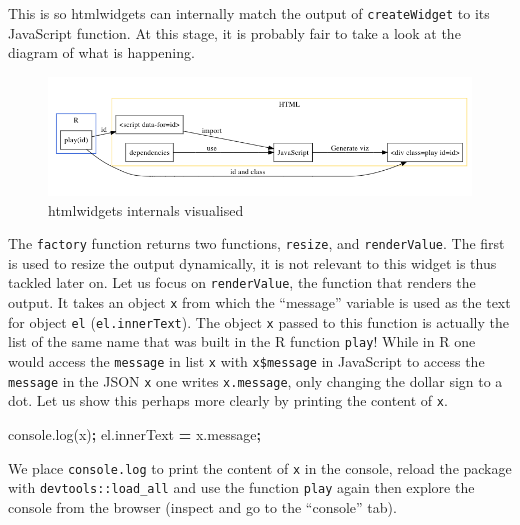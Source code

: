 \documentclass[
  10pt,
]{krantz}
\makeatletter
\newenvironment{Shaded}{\begin{snugshade}}{\end{snugshade}}
\newcommand{\AttributeTok}[1]{\textcolor[rgb]{0.61,0.61,0.61}{#1}}
\newcommand{\NormalTok}[1]{#1}
\newcommand{\OperatorTok}[1]{\textcolor[rgb]{0.43,0.43,0.43}{\textbf{#1}}}
\newcommand{\VariableTok}[1]{\textcolor[rgb]{0,0,0}{#1}}
\newenvironment{kframe}{%
\medskip{}
\setlength{\fboxsep}{.8em}
 \def\at@end@of@kframe{}%
 \ifinner\ifhmode%
  \def\at@end@of@kframe{\end{minipage}}%
  \begin{minipage}{\columnwidth}%
 \fi\fi%
 \def\FrameCommand##1{\hskip\@totalleftmargin \hskip-\fboxsep
 \colorbox{shadecolor}{##1}\hskip-\fboxsep
     \hskip-\linewidth \hskip-\@totalleftmargin \hskip\columnwidth}%
 \MakeFramed {\advance\hsize-\width
   \@totalleftmargin\z@ \linewidth\hsize
   \@setminipage}}%
 {\par\unskip\endMakeFramed%
 \at@end@of@kframe}
\renewenvironment{Shaded}{\begin{kframe}}{\end{kframe}}
\makeatother
\begin{document}
This is so htmlwidgets can internally match the output of \texttt{createWidget} to its JavaScript function. At this stage, it is probably fair to take a look at the diagram of what is happening.

\begin{figure}[H]

{\centering \includegraphics[width=1\linewidth]{images/03-htmlwidgets-internals} 

}

\caption{htmlwidgets internals visualised}\label{fig:widget-internals-diagram}
\end{figure}

The \texttt{factory} function returns two functions, \texttt{resize}, and \texttt{renderValue}. The first is used to resize the output dynamically, it is not relevant to this widget is thus tackled later on. Let us focus on \texttt{renderValue}, the function that renders the output. It takes an object \texttt{x} from which the ``message'' variable is used as the text for object \texttt{el} (\texttt{el.innerText}). The object \texttt{x} passed to this function is actually the list of the same name that was built in the R function \texttt{play}! While in R one would access the \texttt{message} in list \texttt{x} with \texttt{x\$message} in JavaScript to access the \texttt{message} in the JSON \texttt{x} one writes \texttt{x.message}, only changing the dollar sign to a dot. Let us show this perhaps more clearly by printing the content of \texttt{x}.

\begin{Shaded}
\begin{Highlighting}[]
\VariableTok{console}\NormalTok{.}\AttributeTok{log}\NormalTok{(x)}\OperatorTok{;}
\VariableTok{el}\NormalTok{.}\AttributeTok{innerText} \OperatorTok{=} \VariableTok{x}\NormalTok{.}\AttributeTok{message}\OperatorTok{;}
\end{Highlighting}
\end{Shaded}

We place \texttt{console.log} to print the content of \texttt{x} in the console, reload the package with \texttt{devtools::load\_all} and use the function \texttt{play} again then explore the console from the browser (inspect and go to the ``console'' tab).
\end{document}

